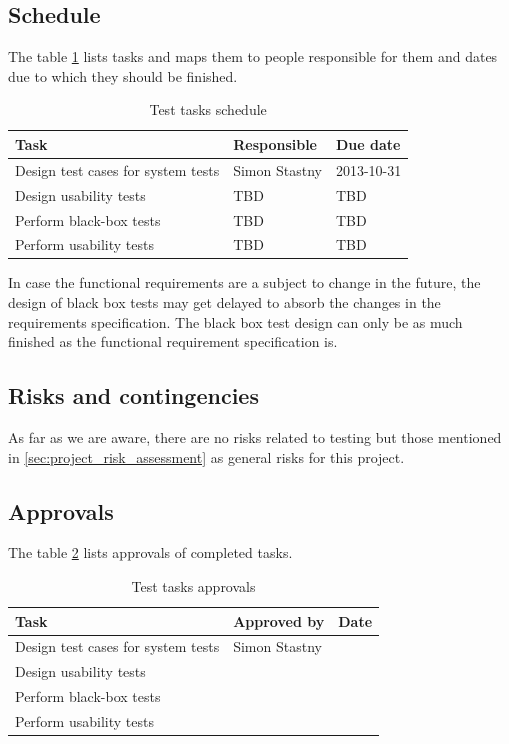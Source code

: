 \documentclass[11pt]{book}
\begin{document}
\subsection{Schedule}

The table \ref{tab:test_plan_schedule} lists tasks and maps them to people responsible for them and dates due to which they should be finished. 

\begin{table}[H]
	\centering
	\begin{tabular}{| l | l | l |}
		\hline
		Task 								& Responsible 	& Due date		\\ \hline
		Design test cases for system tests 	& Simon Stastny & 2013-10-31 	\\ \hline
		Design usability tests 				& TBD 			& TBD 			\\ \hline
		Perform black-box tests 			& TBD 			& TBD 			\\ \hline
		Perform usability tests 			& TBD 			& TBD 			\\ \hline
	\end{tabular}
	\label{tab:test_plan_schedule}
	\caption{Test tasks schedule}
\end{table}

In case the functional requirements are a subject to change in the future, the design of black box tests may get delayed to absorb the changes in the requirements specification. The black box test design can only be as much finished as the functional requirement specification is.

\subsection{Risks and contingencies}

As far as we are aware, there are no risks related to testing but those mentioned in \ref{sec:project_risk_assessment} as general risks for this project.

\subsection{Approvals}

The table \ref{tab:test_plan_approvals} lists approvals of completed tasks.

\begin{table}[H]
	\centering
	\begin{tabular}{| l | l | l |}
		\hline
		Task 								& Approved by 	& Date 	\\ \hline
		Design test cases for system tests 	& Simon Stastny & 		\\ \hline
		Design usability tests 				& 				& 		\\ \hline
		Perform black-box tests 			& 				& 		\\ \hline
		Perform usability tests 			& 				& 		\\ \hline
	\end{tabular}
	\label{tab:test_plan_approvals}
	\caption{Test tasks approvals}
\end{table}
\end{document}
